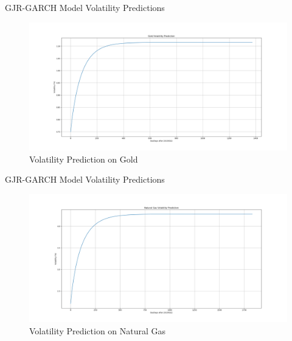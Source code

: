 \documentclass[8pt]{beamer}
\numberwithin{equation}{section}
\begin{document}
\begin{frame}{GJR-GARCH Model Volatility Predictions}

\begin{figure}[!ht]
	\includegraphics[width=\linewidth]{Goldvol.png} %
	\caption{Volatility Prediction on Gold} %
	\label{gold pred} %
\end{figure}

\end{frame}

\begin{frame}{GJR-GARCH Model Volatility Predictions}

\begin{figure}[!ht]
	\includegraphics[width=\linewidth]{Naturalgasvol.png} %
	\caption{Volatility Prediction on Natural Gas} %
	\label{gas pred} %
\end{figure}

\end{frame}
\end{document}
